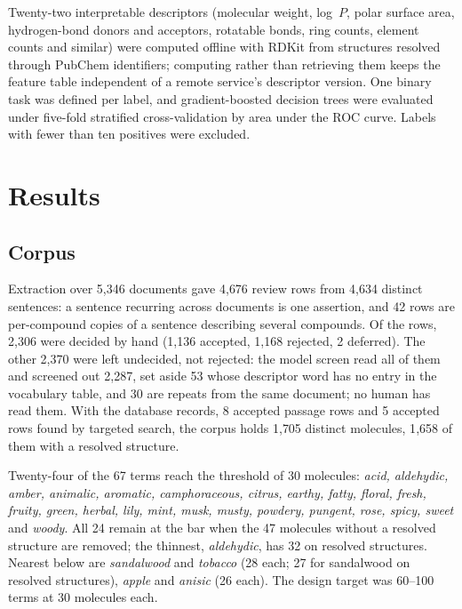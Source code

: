 \documentclass[
  computerscience
]{genesisl1-paper}
\begin{document}
Twenty-two interpretable descriptors (molecular weight, log~$P$, polar surface area,
hydrogen-bond donors and acceptors, rotatable bonds, ring counts, element counts and
similar) were computed offline with RDKit from structures resolved through PubChem
identifiers; computing rather than retrieving them keeps the feature table independent of
a remote service's descriptor version. One binary task was defined per label, and
gradient-boosted decision trees were evaluated under five-fold stratified
cross-validation by area under the ROC curve. Labels with fewer than ten positives were
excluded.

\section{Results}

\subsection{Corpus}

Extraction over 5{,}346 documents gave 4{,}676 review rows from 4{,}634 distinct
sentences: a sentence recurring across documents is one assertion, and 42 rows are
per-compound copies of a sentence describing several compounds. Of the rows, 2{,}306
were decided by hand (1{,}136 accepted, 1{,}168 rejected, 2 deferred). The other 2{,}370
were left undecided, not rejected: the model screen read all of them and screened out
2{,}287, set aside 53 whose descriptor word has no entry in the vocabulary table, and 30
are repeats from the same document; no human has read them. With the database records, 8 accepted passage rows and 5 accepted rows found
by targeted search, the corpus holds 1{,}705 distinct molecules, 1{,}658 of them with a
resolved structure.

Twenty-four of the 67 terms reach the threshold of 30 molecules: \emph{acid, aldehydic,
amber, animalic, aromatic, camphoraceous, citrus, earthy, fatty, floral, fresh, fruity,
green, herbal, lily, mint, musk, musty, powdery, pungent, rose, spicy, sweet} and
\emph{woody}. All 24 remain at the bar when the 47 molecules without a resolved structure
are removed; the thinnest, \emph{aldehydic}, has 32 on resolved structures. Nearest below
are \emph{sandalwood} and \emph{tobacco} (28 each; 27 for sandalwood on resolved
structures), \emph{apple} and \emph{anisic} (26 each). The design target was 60--100
terms at 30 molecules each.
\end{document}
